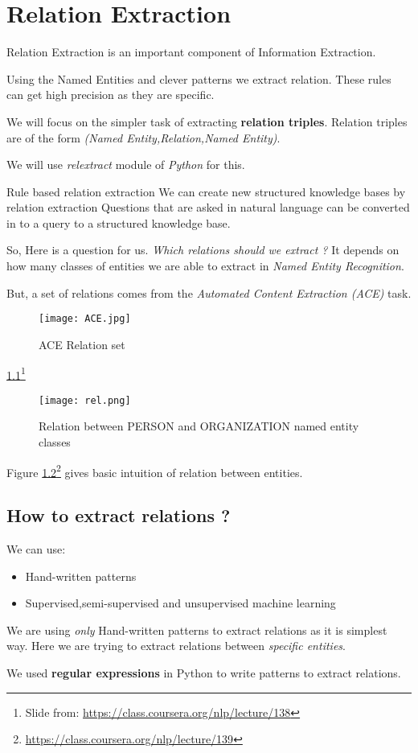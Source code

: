 \documentclass[12pt]{report}
\begin{document}
\chapter{Relation Extraction}
\par Relation Extraction is an important component of Information Extraction.
\par Using the Named Entities and clever patterns we extract relation. These rules can 
get high precision as they are specific.
\par We will focus on the simpler task of extracting \textbf{relation triples}. Relation
triples are of the form \textit{(Named Entity,Relation,Named Entity)}.
\par We will use \textit{relextract} module of \textit{Python} for this.
\par Rule based relation extraction
We can create new structured knowledge bases by relation extraction
Questions that are asked in natural language can be converted in to a query to a structured
knowledge base.\\
\par So, Here is a question for us. \textit{Which relations should we extract ?} It depends
on how many classes of entities we are able to extract in \textit{Named Entity Recognition}.

But, a set of relations  comes from the \textit{Automated Content Extraction (ACE)} task.
\begin{figure}[htp]
\centering
\texttt{[image: ACE.jpg]}
\caption{ACE Relation set}
\label{ACE}
\end{figure}
\ref{ACE}\footnote{Slide from: \url{https://class.coursera.org/nlp/lecture/138}}
\begin{figure}[htp]
\centering
\texttt{[image: rel.png]}
\caption{Relation between PERSON and ORGANIZATION named entity classes}
\label{IE}
\end{figure}

Figure \ref{IE}\footnote{\url{https://class.coursera.org/nlp/lecture/139}} gives basic intuition of relation between entities.

\section{How to extract relations ?}
We can use:
\begin{itemize}
\item Hand-written patterns
\item Supervised,semi-supervised and unsupervised machine learning
\end{itemize}
We are using \textit{only} Hand-written patterns to extract relations as it is simplest
way. Here we are trying to extract relations between \textit{specific entities}.
\par We used \textbf{regular expressions } \cite{re} in Python to write patterns to extract relations.
\end{document}
